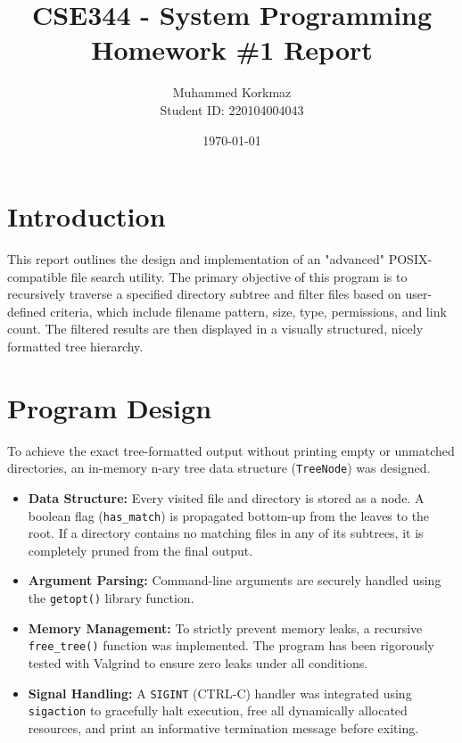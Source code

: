 \documentclass[12pt,a4paper]{article}
\title{\textbf{CSE344 - System Programming} \\ \Large Homework \#1 Report}
\author{Muhammed Korkmaz \\ Student ID: 220104004043}
\date{\today}
\begin{document}
\maketitle

\section{Introduction}
This report outlines the design and implementation of an "advanced" POSIX-compatible file search utility. The primary objective of this program is to recursively traverse a specified directory subtree and filter files based on user-defined criteria, which include filename pattern, size, type, permissions, and link count. The filtered results are then displayed in a visually structured, nicely formatted tree hierarchy.

\section{Program Design}
To achieve the exact tree-formatted output without printing empty or unmatched directories, an in-memory n-ary tree data structure (\texttt{TreeNode}) was designed. 

\begin{itemize}
    \item \textbf{Data Structure:} Every visited file and directory is stored as a node. A boolean flag (\texttt{has\_match}) is propagated bottom-up from the leaves to the root. If a directory contains no matching files in any of its subtrees, it is completely pruned from the final output.
    \item \textbf{Argument Parsing:} Command-line arguments are securely handled using the \texttt{getopt()} library function.
    \item \textbf{Memory Management:} To strictly prevent memory leaks, a recursive \texttt{free\_tree()} function was implemented. The program has been rigorously tested with Valgrind to ensure zero leaks under all conditions.
    \item \textbf{Signal Handling:} A \texttt{SIGINT} (CTRL-C) handler was integrated using \texttt{sigaction} to gracefully halt execution, free all dynamically allocated resources, and print an informative termination message before exiting.
\end{itemize}
\end{document}
